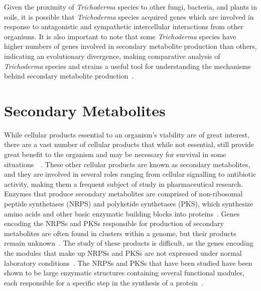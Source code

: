 Given the proximity of \textit{Trichoderma} species to other fungi, bacteria, and plants in soils, it is possible that \textit{Trichoderma} species acquired genes which are involved in response to antagonistic and sympathetic intercellular interactions from other organisms. It is also important to note that some \textit{Trichoderma} species have higher numbers of genes involved in secondary metabolite production than others, indicating an evolutionary divergence, making comparative analysis of \textit{Trichoderma} species and strains a useful tool for understanding the mechanisms behind secondary metabolite production~\cite{Mukherjee2012}.

\section{Secondary Metabolites}
\label{lit:secondary-metabolites}

While cellular products essential to an organism's viability are
of great interest, there are a vast number of cellular products that while not
essential, still provide great benefit to the
organism and may be necessary for survival in some situations~\cite{Craney2013}~\cite{Mukherjee2012}. These other cellular products are known
 as secondary metabolites, and they are involved in several roles ranging 
 from cellular signalling to antibiotic activity, making them a frequent 
 subject of study in pharmaceutical research. Enzymes that produce 
 secondary metabolites are comprised of non-ribosomal peptide synthetases 
 (NRPS) and polyketide synthetases (PKS), which synthesize amino acids and 
 other basic enzymatic building blocks into proteins~\cite{komaki2020}. 
 Genes encoding the NRPSs and PKSs responsible for production of secondary 
 metabolites are often found in clusters within a genome, but their 
 products remain unknown~\cite{Mukherjee2012}. 
 The study of these products is difficult, as the genes encoding the modules that make up NRPSs and PKSs are not expressed under normal laboratory conditions~\cite{Mukherjee2012}. The NRPSs and PKSs that have been studied
 have been shown to be large enzymatic structures containing several 
 functional modules, each responsible for a specific step in the synthesis 
 of a protein~\cite{Mukherjee2012}. 

